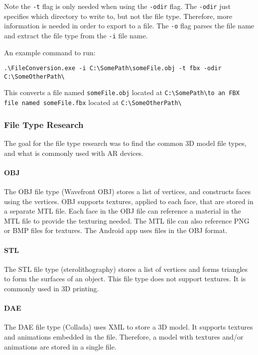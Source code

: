     Note the \texttt{-t} flag is only needed when using the \texttt{-odir} flag.  The \texttt{-odir} just specifies which directory to write to, but not the file type.
    Therefore, more information is needed in order to export to a file.  The \texttt{-o} flag parses the file name and extract the file type from the \texttt{-i} file name.
    
    An example command to run:
    
    \begin{center}
        \texttt{.\textbackslash FileConversion.exe -i C:\textbackslash SomePath\textbackslash someFile.obj -t fbx -odir C:\textbackslash SomeOtherPath\textbackslash}
    \end{center}
    
    This converts a file named \texttt{someFile.obj} located at \texttt{C:\textbackslash SomePath\textbackslash  to an FBX file named someFile.fbx} located at 
    \texttt{C:\textbackslash SomeOtherPath\textbackslash}
    
    \subsubsection{File Type Research}

    The goal for the file type research was to find the common 3D model file types, and what is commonly used with AR devices.

    \paragraph{OBJ}
    The OBJ file type (Wavefront OBJ) stores a list of vertices, and constructs faces using the vertices.  OBJ supports textures, applied to each face, that are stored in a separate MTL file.  Each face in the OBJ file can reference a material in the MTL file to provide the texturing needed. The MTL file can also reference PNG or BMP files for textures. The Android app uses files in the OBJ format.

    \paragraph{STL}
    The STL file type (sterolithography) stores a list of vertices and forms triangles to form the surfaces of an object.  This file type does not support textures.  It is commonly used in 3D printing.

    \paragraph{DAE}
    The DAE file type (Collada) uses XML to store a 3D model.  It supports textures and animations embedded in the file.  Therefore, a model with textures and/or animations are stored in a single file.

